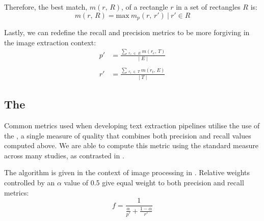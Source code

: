 Therefore, the best match, $m(r,\,R)$, of a rectangle $r$ in a set of rectangles $R$ is:
\begin{equation*}
  m(r,\,R) = \mathrm{max}~m_{p}(r,\,r')~|~r' \in R
\end{equation*}

Lastly, we can redefine the recall and precision metrics to be more forgiving in the image extraction context:
\begin{align*}
  p' &= \frac{\sum\,_{r_{e}\;\in\;E}~m(r_{e},\,T)}{\lvert\;E\;\rvert}\\ \\
  r' &= \frac{\sum\,_{r_{t}\;\in\;T}~m(r_{t},\,E)}{\lvert\;T\;\rvert}
\end{align*}

\subsection{The \fscore}
\label{sec:background:metrics:fscore}

Common metrics used when developing text extraction pipelines utilise the use of the \fscore, a single measure of quality that combines both precision and recall values computed above. We are able to compute this metric using the standard measure across many studies, as contrasted in .

The \fscore{} algorithm is given in the context of image processing in \citet{Lucas:2003iw}. Relative weights controlled by an $\alpha$ value of 0.5 give equal weight to both precision and recall metrics:
\begin{equation*}
  f = \frac{1}{\frac{\alpha}{p'} + \frac{1-\alpha}{r'}}
\end{equation*}

